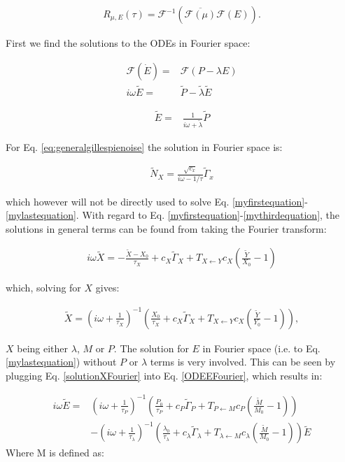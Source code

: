 \documentclass[a4paper,twoside,10pt]{report}
\begin{document}
\begin{align}
R_{\mu,E}(\tau) = \mathcal{F}^{-1} \left( \overline{\mathcal{F} (\mu)} \mathcal{F}(E) \right)
.
\end{align}

First we find the solutions to the ODEs in Fourier space:

\begin{align}
\label{ODEEFourier}
\mathcal{F} \left( \dot{E} \right) = & \mathcal{F} \left( P - \lambda E \right) \nonumber \\
%
i\omega \tilde{E} = & \tilde{P} - \tilde{\lambda} \tilde{E}
\end{align}

\begin{align}
 \tilde{E} = & \frac{1}{i\omega+\tilde{\lambda}} \tilde{P} 
\end{align}

For Eq. \ref{eq:generalgillespienoise} the solution in Fourier space is:

\begin{align}
\tilde{N}_X = \frac{\sqrt{c_x}}{i\omega - 1/\tau} \tilde{\Gamma}_x
\end{align}

which however will not be directly used to solve Eq. \ref{myfirstequation}-\ref{mylastequation}. With regard to  Eq. \ref{myfirstequation}-\ref{mythirdequation}, the solutions in general terms can be found from taking the Fourier transform:

\begin{align}
i \omega \tilde{X} = - \frac{\tilde{X}-X_0}{\tau_X} + c_X \tilde{\Gamma}_X + T_{X \leftarrow Y} c_X (\frac{\tilde{Y}}{X_0} - 1)
\end{align}

which, solving for $X$ gives:

\begin{align}
\label{solutionXFourier}
\tilde{X} = \left( i \omega + \frac{1}{\tau_X} \right)^{-1} \left( \frac{X_0}{\tau_X} + c_X \tilde{\Gamma}_X + T_{X \leftarrow Y} c_X (\frac{\tilde{Y}}{Y_0} - 1) \right)
,
\end{align}

$X$ being either $\lambda$, $M$ or $P$.
%
The solution for $E$ in Fourier space (i.e. to Eq. \ref{mylastequation}) without $P$ or $\lambda$ terms is very involved. This can be seen by plugging Eq. \ref{solutionXFourier} into Eq. \ref{ODEEFourier}, which results in:

\begin{align}
\label{ODEEFourierExpanded}
i\omega \tilde{E} = & 
\left( i \omega + \frac{1}{\tau_P} \right)^{-1} \left( \frac{P_0}{\tau_P} + c_P \tilde{\Gamma}_P + T_{P \leftarrow M} c_P (\frac{\tilde{M}}{M_0} - 1) \right)
     \nonumber \\
    & -
    \left( i \omega + \frac{1}{\tau_\lambda} \right)^{-1} \left( \frac{\lambda_0}{\tau_\lambda} + c_\lambda \tilde{\Gamma}_\lambda + T_{\lambda \leftarrow M} c_\lambda (\frac{\tilde{M}}{M_0} - 1) \right)
     \tilde{E}
\end{align}
Where M is defined as:
\end{document}
